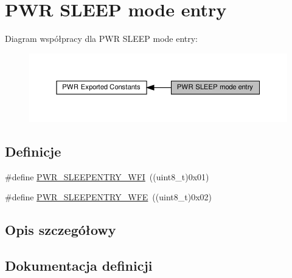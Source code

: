\hypertarget{group___p_w_r___s_l_e_e_p__mode__entry}{}\section{P\+WR S\+L\+E\+EP mode entry}
\label{group___p_w_r___s_l_e_e_p__mode__entry}
Diagram współpracy dla P\+WR S\+L\+E\+EP mode entry\+:\nopagebreak
\begin{figure}[H]
\begin{center}
\leavevmode
\includegraphics[width=350pt]{group___p_w_r___s_l_e_e_p__mode__entry}
\end{center}
\end{figure}
\subsection*{Definicje}
\begin{DoxyCompactItemize}
\item 
\#define \hyperlink{group___p_w_r___s_l_e_e_p__mode__entry_ga4f0f99a3526c57efb3501b016639fa45}{P\+W\+R\+\_\+\+S\+L\+E\+E\+P\+E\+N\+T\+R\+Y\+\_\+\+W\+FI}~((uint8\+\_\+t)0x01)
\item 
\#define \hyperlink{group___p_w_r___s_l_e_e_p__mode__entry_ga2ef4bd42ad37dcfcd0813676087d559e}{P\+W\+R\+\_\+\+S\+L\+E\+E\+P\+E\+N\+T\+R\+Y\+\_\+\+W\+FE}~((uint8\+\_\+t)0x02)
\end{DoxyCompactItemize}


\subsection{Opis szczegółowy}


\subsection{Dokumentacja definicji}
\mbox{\label{group___p_w_r___s_l_e_e_p__mode__entry_ga2ef4bd42ad37dcfcd0813676087d559e}} 
